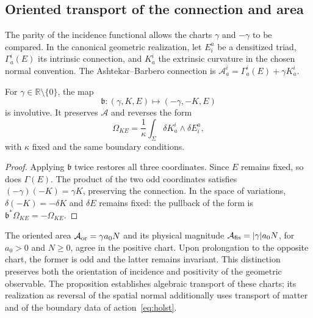 \subsection{Oriented transport of the connection and area}
\label{sec:ii-costura-barbero}
The parity of the incidence functional allows the charts
\(\gamma\) and \(-\gamma\) to be compared. In the canonical geometric realization,
let \(E^a_i\) be a densitized triad, \(\Gamma_a^i(E)\) its
intrinsic connection, and \(K_a^i\) the extrinsic curvature in the
chosen normal convention. The Ashtekar--Barbero connection is
\(\mathcal A_a^i=\Gamma_a^i(E)+\gamma K_a^i\).

\begin{proposition}
\label{prop:ii-costura-barbero}
For \(\gamma\in\mathbb R\setminus\{0\}\), the map
\[
 \mathfrak b:(\gamma,K,E)\longmapsto(-\gamma,-K,E)
\]
is involutive. It preserves \(\mathcal A\) and reverses the form
\[
 \Omega_{KE}=\frac1\kappa\int_\Sigma
 \delta K_a^i\wedge\delta E^a_i,
\]
with \(\kappa\) fixed and the same boundary conditions.
\end{proposition}
\begin{proof}
Applying \(\mathfrak b\) twice restores all three coordinates.
Since \(E\) remains fixed, so does \(\Gamma(E)\).
The product of the two odd coordinates satisfies
\((-\gamma)(-K)=\gamma K\), preserving the connection.
In the space of variations, \(\delta(-K)=-\delta K\) and
\(\delta E\) remains fixed: the pullback of the form is
\(\mathfrak b^*\Omega_{KE}=-\Omega_{KE}\).
\end{proof}

The oriented area \(\mathcal A_{\rm or}=\gamma a_0N\) and its
physical magnitude \(\mathcal A_{\rm fis}=|\gamma|a_0N\), for
\(a_0>0\) and \(N\geq0\), agree in the positive chart.
Upon prolongation to the opposite chart, the former is odd and the latter
remains invariant. This distinction preserves both the orientation
of incidence and positivity of the geometric observable.
The proposition establishes algebraic transport of these charts;
its realization as reversal of the spatial normal additionally uses
transport of matter and of the boundary data
of action~\eqref{eq:holst}.
